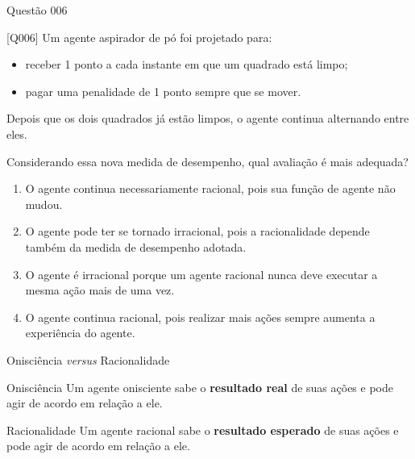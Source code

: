 \documentclass[xcolor=dvipsnames,table]{beamer}
\begin{document}
	\begin{frame}{Questão 006}
		\footnotesize

    \begin{block}{[Q006]}
        Um agente aspirador de pó foi projetado para:

        \begin{itemize}
            \item receber 1 ponto a cada instante em que um quadrado está limpo;
            \item pagar uma penalidade de 1 ponto sempre que se mover.
        \end{itemize}

        Depois que os dois quadrados já estão limpos, o agente continua
        alternando entre eles.

        Considerando essa nova medida de desempenho, qual avaliação
        é mais adequada?
    \end{block}

    \begin{enumerate}[label=(\Alph*)]

        \item O agente continua necessariamente racional, pois sua função
        de agente não mudou.

        \item O agente pode ter se tornado irracional, pois a racionalidade
        depende também da medida de desempenho adotada.

        \item O agente é irracional porque um agente racional nunca deve
        executar a mesma ação mais de uma vez.

        \item O agente continua racional, pois realizar mais ações sempre
        aumenta a experiência do agente.

    \end{enumerate}

\end{frame}
	
	\begin{frame}{Onisciência {\it versus} Racionalidade}
		\begin{block}{Onisciência}
			Um agente onisciente sabe o {\color{blue} \bf resultado real} de suas ações e pode agir de acordo em relação a ele.
		\end{block}	\pause
		\begin{block}{Racionalidade}
			Um agente racional sabe o {\color{blue} \bf resultado esperado} de suas ações e pode agir de acordo em relação a ele.
		\end{block}
	\end{frame}
\end{document}
